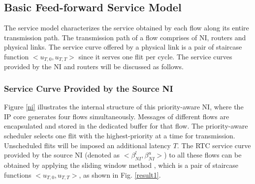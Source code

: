 \documentclass[preprint]{elsarticle}
\begin{document}
\subsection{Basic Feed-forward Service Model}\label{sm}
The service model characterizes the service obtained by each flow along its entire transmission path. The transmission path of a flow comprises of NI, routers and physical links. The service curve offered by a physical link is a pair of staircase function $<u_{T,0},u_{T,T}>$ since it serves one flit per cycle. The service curves provided by the NI and routers will be discussed as follows.

\subsubsection{Service Curve Provided by the Source NI}
Figure \ref{ni} illustrates the internal structure of this priority-aware NI, where the IP core generates four flows simultaneously. Messages of different flows are encapsulated and stored in the dedicated buffer for that flow. The priority-aware scheduler selects one flit with the highest-priority at a time for transmission. Unscheduled flits will be imposed an additional latency $T$. The RTC service curve provided by the source NI (denoted as $<\beta^l_{NI},\beta^u_{NI}>$) to all these flows can be obtained by applying the sliding window method \cite{1253607}, which is a pair of staircase functions $<u_{T,0},u_{T,T}>$, as shown in Fig. \ref{result1}.
\end{document}

